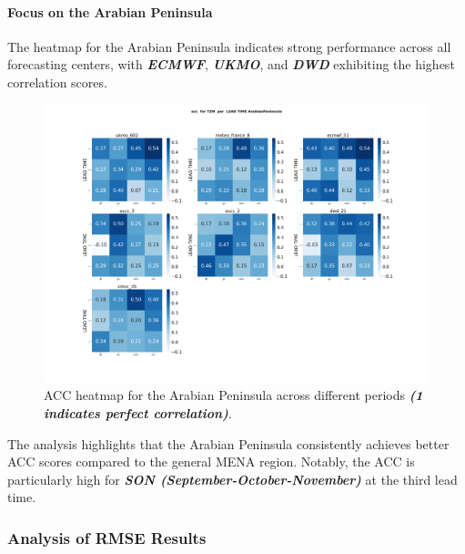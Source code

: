 \paragraph{Focus on the Arabian Peninsula}  
The heatmap for the Arabian Peninsula indicates strong performance across all forecasting centers, with \textbf{\textit{ECMWF}}, \textbf{\textit{UKMO}}, and \textbf{\textit{DWD}} exhibiting the highest correlation scores.  

\begin{figure}[H]
\centering
\includegraphics[scale=0.25]{plots/det/acc/acc_T2M_ArabianPeninsula.png}
\caption{ACC heatmap for the Arabian Peninsula across different periods \textbf{\textit{(1 indicates perfect correlation)}}.}
\end{figure}

The analysis highlights that the Arabian Peninsula consistently achieves better ACC scores compared to the general MENA region. Notably, the ACC is particularly high for \textbf{\textit{SON (September-October-November)}} at the third lead time.
\subsubsection{Analysis of RMSE Results}

\vspace{1.5cm}

